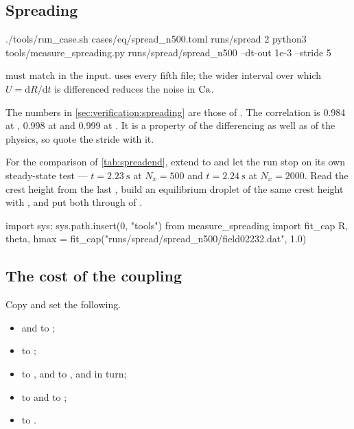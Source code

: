 \subsection{Spreading}

\begin{shell}
./tools/run_case.sh cases/eq/spread_n500.toml runs/spread 2
python3 tools/measure_spreading.py runs/spread/spread_n500 --dt-out 1e-3 --stride 5
\end{shell}

 must match  in the input.
 uses every fifth file; the wider interval over which
$U = \mathrm{d}R/\mathrm{d}t$ is differenced reduces the noise in $\mathrm{Ca}$.

\begin{note}
  The numbers in \cref{sec:verification:spreading} are those of
  . The correlation is 0.984 at , 0.998 at
   and 0.999 at . It is a property of the
  differencing as well as of the physics, so quote the stride with it.
\end{note}

For the comparison of \cref{tab:spreadend}, extend  to 
and let the run stop on its own steady-state test --- $t = \SI{2.23}{\second}$
at $N_x = 500$ and $t = \SI{2.24}{\second}$ at $N_x = 2000$. Read the crest
height from the last , build an equilibrium droplet of the
same crest height with
, and put
both through  of .

\begin{plain}
import sys; sys.path.insert(0, "tools")
from measure_spreading import fit_cap
R, theta, hmax = fit_cap("runs/spread/spread_n500/field02232.dat", 1.0)
\end{plain}

\subsection{The cost of the coupling}

Copy  and set the following.

\begin{itemize}
  \item {} and  to
    ;
  \item {} to ;
  \item {} to , and
     to ,  and  in
    turn;
  \item {} to  and to
    ;
  \item {} to .
\end{itemize}

